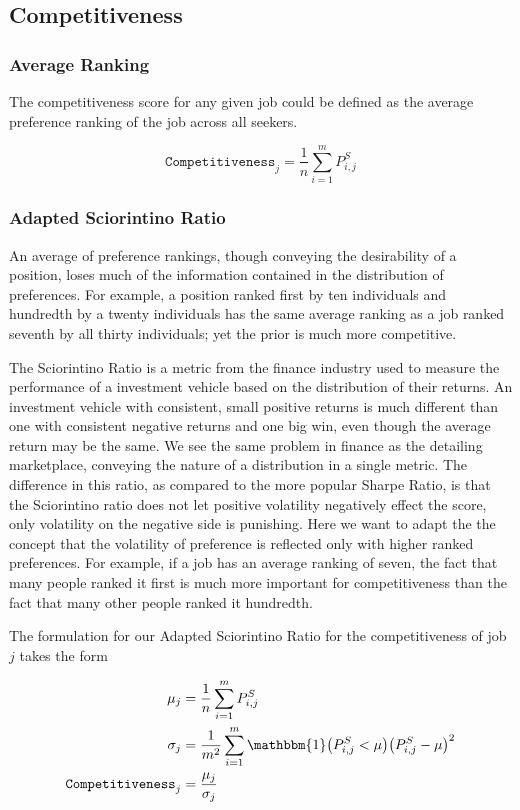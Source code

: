 \subsection{Competitiveness}

\subsubsection{Average Ranking}

The competitiveness score for any given job could be defined as the average preference ranking of the job across all seekers.

\[\texttt{Competitiveness}_j = \frac{1}{n} \sum_{i=1}^m P^S_{i,j}\]

\subsubsection{Adapted Sciorintino Ratio}

An average of preference rankings, though conveying the desirability of a position, loses much of the information contained in the distribution of preferences. For example, a position ranked first by ten individuals and hundredth by a twenty individuals has the same average ranking as a job ranked seventh by all thirty individuals; yet the prior is much more competitive. 

The Sciorintino Ratio is a metric from the finance industry used to measure the performance of a investment vehicle based on the distribution of their returns. An investment vehicle with consistent, small positive returns is much different than one with consistent negative returns and one big win, even though the average return may be the same. We see the same problem in finance as the detailing marketplace, conveying the nature of a distribution in a single metric. The difference in this ratio, as compared to the more popular Sharpe Ratio, is that the Sciorintino ratio does not let positive volatility negatively effect the score, only volatility on the negative side is punishing. Here we want to adapt the the concept that the volatility of preference is reflected only with higher ranked preferences. For example, if a job has an average ranking of seven, the fact that many people ranked it first is much more important for competitiveness than the fact that many other people ranked it hundredth.

The formulation for our Adapted Sciorintino Ratio for the competitiveness of job $j$ takes the form

\begin{align}
\mu_j &= \frac{1}{n} \sum_{i=1}^m P^S_{i,j} \\
\sigma_j &= \frac{1}{m^2} \sum_{i=1}^m \mathbbm{1}\big( P^S_{i,j} < \mu \big) \big(P^S_{i,j} - \mu \big)^2 \\
\texttt{Competitiveness}_j &= \frac{\mu_j}{\sigma_j}
\end{align}


